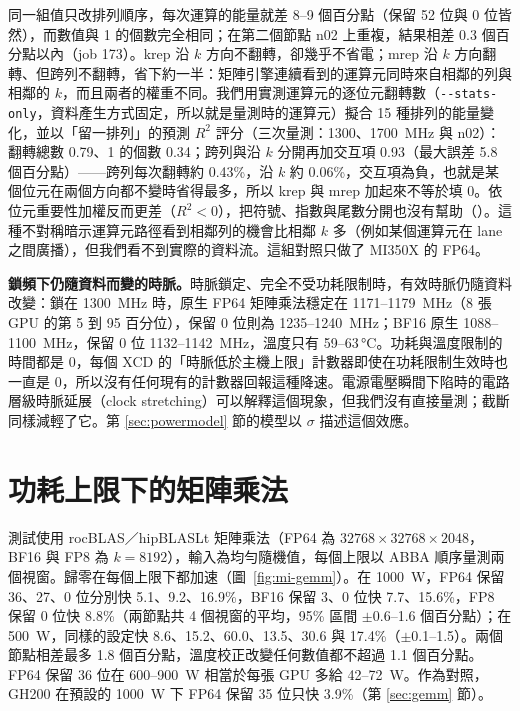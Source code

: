 同一組值只改排列順序，每次運算的能量就差 8–9 個百分點（保留 52 位與 0 位皆然），而數值與 1 的個數完全相同；在第二個節點 n02 上重複，結果相差 0.3 個百分點以內（job 173）。krep 沿 $k$ 方向不翻轉，卻幾乎不省電；mrep 沿 $k$ 方向翻轉、但跨列不翻轉，省下約一半：矩陣引擎連續看到的運算元同時來自相鄰的列與相鄰的 $k$，而且兩者的權重不同。我們用實測運算元的逐位元翻轉數（\texttt{-{}-stats-only}，資料產生方式固定，所以就是量測時的運算元）擬合 15 種排列的能量變化，並以「留一排列」的預測 $R^2$ 評分（三次量測：1300、1700~MHz 與 n02）：翻轉總數 0.79、1 的個數 0.34；跨列與沿 $k$ 分開再加交互項 0.93（最大誤差 5.8 個百分點）——跨列每次翻轉約 0.43\%，沿 $k$ 約 0.06\%，交互項為負，也就是某個位元在兩個方向都不變時省得最多，所以 krep 與 mrep 加起來不等於填 0。依位元重要性加權反而更差（$R^2<0$），把符號、指數與尾數分開也沒有幫助（）。這種不對稱暗示運算元路徑看到相鄰列的機會比相鄰 $k$ 多（例如某個運算元在 lane 之間廣播），但我們看不到實際的資料流。這組對照只做了 MI350X 的 FP64。

\textbf{鎖頻下仍隨資料而變的時脈。}時脈鎖定、完全不受功耗限制時，有效時脈仍隨資料改變：鎖在 1300~MHz 時，原生 FP64 矩陣乘法穩定在 1171–1179~MHz（8 張 GPU 的第 5 到 95 百分位），保留 0 位則為 1235–1240~MHz；BF16 原生 1088–1100~MHz，保留 0 位 1132–1142~MHz，溫度只有 59–63\,°C。功耗與溫度限制的時間都是 0，每個 XCD 的「時脈低於主機上限」計數器即使在功耗限制生效時也一直是 0，所以沒有任何現有的計數器回報這種降速。電源電壓瞬間下陷時的電路層級時脈延展（clock stretching）可以解釋這個現象，但我們沒有直接量測；截斷同樣減輕了它。第 \ref{sec:powermodel} 節的模型以 $\sigma$ 描述這個效應。

\section{功耗上限下的矩陣乘法}\label{sec:mi-gemm}

測試使用 rocBLAS／hipBLASLt 矩陣乘法（FP64 為 $32768\times32768\times2048$，BF16 與 FP8 為 $k=8192$），輸入為均勻隨機值，每個上限以 ABBA 順序量測兩個視窗。歸零在每個上限下都加速（圖~\ref{fig:mi-gemm}）。在 1000~W，FP64 保留 36、27、0 位分別快 5.1、9.2、16.9\%，BF16 保留 3、0 位快 7.7、15.6\%，FP8 保留 0 位快 8.8\%（兩節點共 4 個視窗的平均，95\% 區間 $\pm$0.6–1.6 個百分點）；在 500~W，同樣的設定快 8.6、15.2、60.0、13.5、30.6 與 17.4\%（$\pm$0.1–1.5）。兩個節點相差最多 1.8 個百分點，溫度校正改變任何數值都不超過 1.1 個百分點。FP64 保留 36 位在 600–900~W 相當於每張 GPU 多給 42–72~W。作為對照，GH200 在預設的 1000~W 下 FP64 保留 35 位只快 3.9\%（第 \ref{sec:gemm} 節）。

